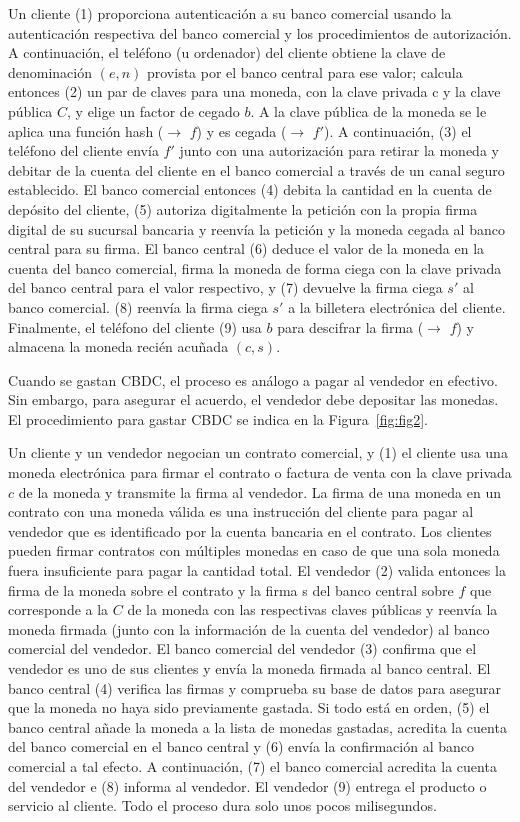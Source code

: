 \documentclass[10pt,spanish]{article}
\begin{document}
Un cliente (1) proporciona autenticación a su banco comercial usando la
autenticación respectiva del banco comercial y los procedimientos de
autorización. A continuación, el teléfono (u ordenador) del cliente
obtiene la clave de denominación $(e, n)$ provista por el banco central
para ese valor; calcula entonces (2) un par de claves para una moneda,
con la clave privada c y la clave pública $C$, y elige un factor de cegado
$b$. A la clave pública de la moneda se le aplica una función hash
($\to$ $f$) y es cegada ($\to$ $f'$). A continuación, (3) el teléfono
del cliente envía $f'$ junto con una autorización para retirar la
moneda y debitar de la cuenta del cliente en el banco comercial a través
de un canal seguro establecido. El banco comercial entonces (4) debita
la cantidad en la cuenta de depósito del cliente, (5) autoriza
digitalmente la petición con la propia firma digital de su sucursal
bancaria y reenvía la petición y la moneda cegada al banco central para
su firma. El banco central (6) deduce el valor de la moneda en la cuenta
del banco comercial, firma la moneda de forma ciega con la clave privada
del banco central para el valor respectivo, y (7) devuelve la firma
ciega $s'$ al banco comercial. (8) reenvía la firma ciega $s'$
a la billetera electrónica del cliente. Finalmente, el teléfono del
cliente (9) usa $b$ para descifrar la firma ($\to$ $f$) y almacena la
moneda recién acuñada $(c, s)$.

Cuando se gastan CBDC, el proceso es análogo a pagar al vendedor en
efectivo. Sin embargo, para asegurar el acuerdo, el vendedor debe
depositar las monedas. El procedimiento para gastar CBDC se indica en la
Figura~\ref{fig:fig2}.

Un cliente y un vendedor negocian un contrato comercial, y (1) el
cliente usa una moneda electrónica para firmar el contrato o factura de
venta con la clave privada $c$ de la moneda y transmite la firma al
vendedor. La firma de una moneda en un contrato con una moneda válida es
una instrucción del cliente para pagar al vendedor que es identificado
por la cuenta bancaria en el contrato. Los clientes pueden firmar
contratos con múltiples monedas en caso de que una sola moneda fuera
insuficiente para pagar la cantidad total. El vendedor (2) valida
entonces la firma de la moneda sobre el contrato y la firma s del banco
central sobre $f$ que corresponde a la $C$ de la moneda con las
respectivas claves públicas y reenvía la moneda firmada (junto con la
información de la cuenta del vendedor) al banco comercial del vendedor.
El banco comercial del vendedor (3) confirma que el vendedor es uno de
sus clientes y envía la moneda firmada al banco central. El banco
central (4) verifica las firmas y comprueba su base de datos para
asegurar que la moneda no haya sido previamente gastada. Si todo está en
orden, (5) el banco central añade la moneda a la lista de monedas
gastadas, acredita la cuenta del banco comercial en el banco central y
(6) envía la confirmación al banco comercial a tal efecto. A
continuación, (7) el banco comercial acredita la cuenta del vendedor e
(8) informa al vendedor. El vendedor (9) entrega el producto o servicio
al cliente. Todo el proceso dura solo unos pocos milisegundos.
\end{document}
